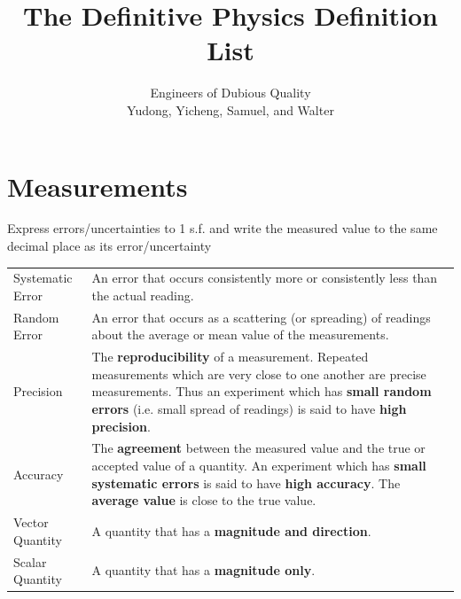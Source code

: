\documentclass[a4paper,11pt]{article}
\title{The Definitive Physics Definition List}
\author{Engineers of Dubious Quality\\Yudong, Yicheng, Samuel, and Walter}
\begin{document}
	
	\maketitle
	
	\section{Measurements}
	Express errors/uncertainties to 1 s.f. and write the measured value to the same decimal place as its error/uncertainty
	
	\begin{center}
		\renewcommand{\arraystretch}{1.5}
		\begin{tabular}{@{} l p{11.6cm} @{}}
			\toprule
			Systematic Error & An error that occurs consistently more or consistently less than the actual reading.\\
			Random Error & An error that occurs as a scattering (or spreading) of readings about the average or mean value of the measurements. \\
			\midrule
			Precision & The \textbf{reproducibility} of a measurement. Repeated measurements which are very close to one another are precise measurements. Thus an experiment which has \textbf{small random errors} (i.e. small spread of readings) is said to have \textbf{high precision}. \\
			Accuracy & The \textbf{agreement} between the measured value and the true or accepted value of a quantity. An experiment which has \textbf{small systematic errors} is said to have \textbf{high accuracy}. The \textbf{average value} is close to the true value. \\
			\midrule
			Vector Quantity & A quantity that has a \textbf{magnitude and direction}. \\
			Scalar Quantity & A quantity that has a \textbf{magnitude only}. \\
			\bottomrule
		\end{tabular}
	\end{center}
	\newpage
\end{document}

